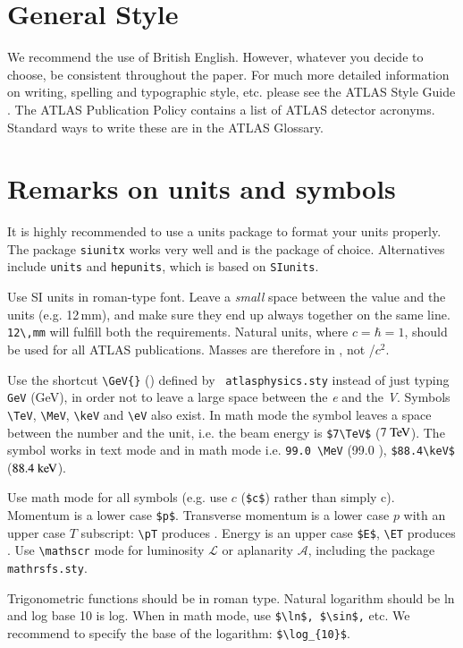 \documentclass[11pt,a4paper]{../atlasnote}
\begin{document}
\section{General Style}

We recommend the use of British English. However, whatever you decide
to choose, be consistent throughout the paper. For much more detailed
information on writing, spelling and typographic style, etc. please
see the ATLAS Style Guide \cite{}. The ATLAS Publication Policy
contains a list of ATLAS detector acronyms. Standard ways to write
these are in the ATLAS Glossary.


\section{Remarks on units and symbols}

It is highly recommended to use a units package to format your units properly.
The package \texttt{siunitx} works very well and is the package of choice.
Alternatives include \texttt{units} and \texttt{hepunits},
which is based on \texttt{SIunits}.

Use SI units in roman-type font. Leave a \emph{small} space between
the value and the units (e.g. 12\,mm), and make sure they end up
always together on the same line. \verb|12\,mm| will fulfill both the
requirements. Natural units, where $c=\hbar=1$, should be used for all
ATLAS publications. Masses are therefore in \GeV, not \GeV/$c^2$.

Use the shortcut \verb|\GeV{}| (\GeV{}) defined by {\tt
atlasphysics.sty} instead of just typing \verb|GeV| (GeV), in order
not to leave a large space between the \emph{e} and the
\emph{V}. Symbols \verb|\TeV|, \verb|\MeV|, \verb|\keV| and \verb|\eV|
also exist. In math mode the symbol leaves a space between the number
and the unit, i.e. the beam energy is \verb+$7\TeV$+ ($7\TeV$). The
symbol works in text mode and in math mode i.e. \verb+99.0 \MeV+
(99.0 \MeV), \verb+$88.4\keV$+ ($88.4\keV$).

Use math mode for all symbols (e.g. use $c$ (\verb|$c$|) rather than
simply c). Momentum is a lower case \verb+$p$+. Transverse momentum is
a lower case $p$ with an upper case $T$ subscript: \verb|\pT| produces
\pT. Energy is an upper case \verb+$E$+, \verb+\ET+ produces \ET.  Use
\verb|\mathscr| mode for luminosity $\mathscr{L}$ or aplanarity
$\mathscr{A}$, including the package \verb|mathrsfs.sty|.

Trigonometric functions should be in roman type. Natural logarithm
should be ln and log base 10 is log.  When in math mode, use
\verb+$\ln$, $\sin$,+ etc. We recommend to specify the base of the
logarithm: \verb+$\log_{10}$+.
\end{document}
